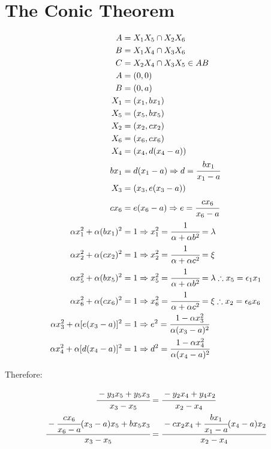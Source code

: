 \documentclass[12pt]{article}
\numberwithin{table}{section}
\begin{document}




\section{The Conic Theorem}

\begin{align}
A &= X_1 X_5 \cap X_2 X_6 \\
B &= X_1 X_4 \cap X_3 X_6 \\
C &= X_2 X_4 \cap X_3 X_5 \in AB \label{eq3} \\
A &= (0,0) \\
B &= (0,a) \\
X_1 &= (x_1, bx_1) \\
X_5 &= (x_5, bx_5) \\
X_2 &= (x_2, cx_2) \\
X_6 &= (x_6, cx_6) \\
X_4 &= (x_4, d(x_4 - a)) \\
bx_1 &= d(x_1 - a) \Rightarrow d = \cfrac{b x_1}{x_1 - a} \\
X_3 &= (x_3, e(x_3 - a)) \\
cx_6 &= e(x_6 - a) \Rightarrow e = \cfrac{cx_6}{x_6 - a} \\
\alpha x_1^2 + \alpha (bx_1)^2 &= 1 \Rightarrow x_1^2 = \cfrac{1}{\alpha + \alpha b^2} = \lambda \\
\alpha x_2^2 + \alpha (cx_2)^2 &= 1 \Rightarrow  x_2^2 =\cfrac{1}{\alpha + \alpha c^2} = \xi\\  
\alpha x_5^2 + \alpha (bx_5)^2 &= 1\Rightarrow x_5^2 = \cfrac{1}{\alpha + \alpha b^2} = \lambda \therefore x_5 = \epsilon_1 x_1 \\
\alpha x_6^2 + \alpha (cx_6)^2 &= 1 \Rightarrow  x_6^2 =\cfrac{1}{\alpha + \alpha c^2} = \xi \therefore x_2 = \epsilon_6 x_6\\
\alpha x_3^2 + \alpha [e(x_3-a)]^2 &= 1 \Rightarrow e^2 = \cfrac{1 - \alpha x_3^2 }{\alpha (x_3-a)^2} \label{eq18}\\
\alpha x_4^2 + \alpha [d(x_4-a)]^2 &= 1 \Rightarrow d^2 = \cfrac{1 - \alpha x_4^2 }{\alpha (x_4-a)^2} \label{eq19}
\end{align}

\newpage

Therefore:

\begin{align}
\cfrac{-y_3 x_5 + y_5 x_3}{x_3 - x_5} &= \cfrac{-y_2 x_4 + y_4 x_2}{x_2 - x_4} \label{eq20} \\
\cfrac{-\cfrac{cx_6}{x_6 - a}(x_3-a) x_5 + b x_5 x_3}{x_3 - x_5} &= \cfrac{-cx_2 x_4 + \cfrac{bx_1}{x_1 - a}(x_4-a) x_2}{x_2 - x_4} 
\end{align}
\end{document}
